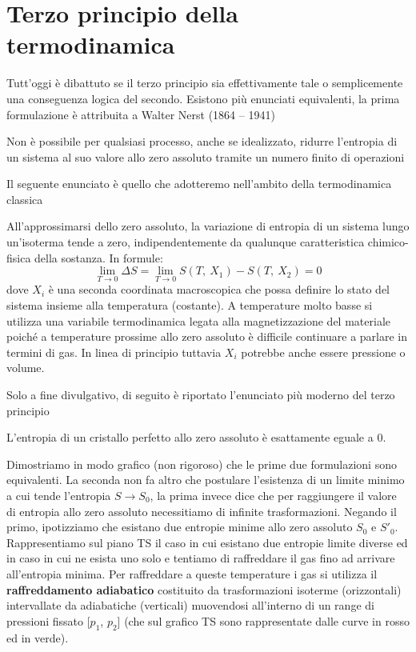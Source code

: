 \documentclass[
10pt, %
a4paper, %
oneside, %
headinclude,footinclude, %
BCOR5mm, %
]{scrartcl}
\begin{document}
\section{Terzo principio della termodinamica}\label{sec:terzo_principio}
Tutt'oggi è dibattuto se il terzo principio sia effettivamente tale o semplicemente una conseguenza logica del secondo. Esistono più enunciati equivalenti, la prima formulazione è attribuita a Walter Nerst (1864 – 1941)
\begin{definition}
	Non è possibile per qualsiasi processo, anche se idealizzato, ridurre l'entropia di un sistema al suo valore allo zero assoluto tramite un numero finito di operazioni 
\end{definition}
Il seguente enunciato è quello che adotteremo nell'ambito della termodinamica classica
\begin{definition}
	All’approssimarsi dello zero assoluto, la variazione di entropia di un sistema lungo un’isoterma tende a zero, indipendentemente da qualunque caratteristica chimico-fisica della sostanza. In formule:
	\[\lim_{T\to 0} \Delta S = \lim_{T\to 0} S(T,\ X_1)-S(T,\ X_2) = 0\]
	dove \(X_i\) è una seconda coordinata macroscopica che possa definire lo stato del sistema insieme alla temperatura (costante). A temperature molto basse si utilizza una variabile termodinamica legata alla magnetizzazione del materiale poiché a temperature prossime allo zero assoluto è difficile continuare a parlare in termini di gas. In linea di principio tuttavia \(X_i \) potrebbe anche essere pressione o volume. 
\end{definition}
Solo a fine divulgativo, di seguito è riportato l'enunciato più moderno del terzo principio
\begin{definition}
	L'entropia di un cristallo perfetto allo zero assoluto è esattamente eguale a 0.
\end{definition}
Dimostriamo in modo grafico (non rigoroso) che le prime due formulazioni sono equivalenti. La seconda non fa altro che postulare l'esistenza di un limite minimo a cui tende l'entropia \(S\to S_0\), la prima invece dice che per raggiungere il valore di entropia allo zero assoluto necessitiamo di infinite trasformazioni. Negando il primo, ipotizziamo che esistano due entropie minime allo zero assoluto \(S_0\) e \(S'_0\). Rappresentiamo sul piano TS il caso in cui esistano due entropie limite diverse ed in caso in cui ne esista uno solo e tentiamo di raffreddare il gas fino ad arrivare all'entropia minima. Per raffreddare a queste temperature i gas si utilizza il \textbf{raffreddamento adiabatico} costituito da trasformazioni isoterme (orizzontali) intervallate da adiabatiche (verticali) muovendosi all'interno di un range di pressioni fissato [\(p_1\), \(p_2\)] (che sul grafico TS sono rappresentate dalle curve in rosso ed in verde). \\
\end{document}
